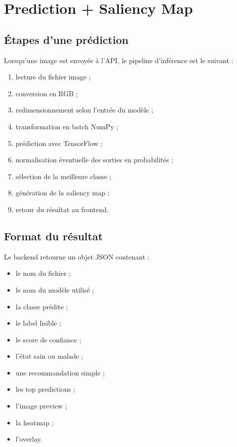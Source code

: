 \documentclass[12pt,a4paper]{report}
\begin{document}
\chapter{Prediction + Saliency Map}

\section{Étapes d'une prédiction}
Lorsqu'une image est envoyée à l'API, le pipeline d'inférence est le suivant :
\begin{enumerate}
  \item lecture du fichier image ;
  \item conversion en RGB ;
  \item redimensionnement selon l'entrée du modèle ;
  \item transformation en batch NumPy ;
  \item prédiction avec TensorFlow ;
  \item normalisation éventuelle des sorties en probabilités ;
  \item sélection de la meilleure classe ;
  \item génération de la saliency map ;
  \item retour du résultat au frontend.
\end{enumerate}

\section{Format du résultat}
Le backend retourne un objet JSON contenant :
\begin{itemize}
  \item le nom du fichier ;
  \item le nom du modèle utilisé ;
  \item la classe prédite ;
  \item le label lisible ;
  \item le score de confiance ;
  \item l'état sain ou malade ;
  \item une recommandation simple ;
  \item les top predictions ;
  \item l'image preview ;
  \item la heatmap ;
  \item l'overlay.
\end{itemize}
\end{document}

